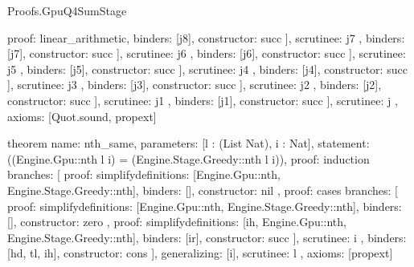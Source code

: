 \begin{lexlean}{Proofs.GpuQ4SumStage}
\begin{semanticmodule}
{{{{{{{{{{{{{{{{                                                {
                                                  proof: linear_arithmetic{},
                                                  binders: [j8],
                                                  constructor: succ
                                                }
                                              ],
                                              scrutinee: j7
                                            },
                                            binders: [j7],
                                            constructor: succ
                                          }
                                        ],
                                        scrutinee: j6
                                      },
                                      binders: [j6],
                                      constructor: succ
                                    }
                                  ],
                                  scrutinee: j5
                                },
                                binders: [j5],
                                constructor: succ
                              }
                            ],
                            scrutinee: j4
                          },
                          binders: [j4],
                          constructor: succ
                        }
                      ],
                      scrutinee: j3
                    },
                    binders: [j3],
                    constructor: succ
                  }
                ],
                scrutinee: j2
              },
              binders: [j2],
              constructor: succ
            }
          ],
          scrutinee: j1
        },
        binders: [j1],
        constructor: succ
      }
    ],
    scrutinee: j
  },
  axioms: [Quot.sound, propext]
}

theorem{
  name: nth_same,
  parameters: [l : (List Nat), i : Nat],
  statement: ((Engine.Gpu::nth l i) = (Engine.Stage.Greedy::nth l i)),
  proof: induction{
    branches: [
      {
        proof: simplify{definitions: [Engine.Gpu::nth, Engine.Stage.Greedy::nth]},
        binders: [],
        constructor: nil
      },
      {
        proof: cases{
          branches: [
            {
              proof: simplify{definitions: [Engine.Gpu::nth, Engine.Stage.Greedy::nth]},
              binders: [],
              constructor: zero
            },
            {
              proof: simplify{definitions: [ih, Engine.Gpu::nth, Engine.Stage.Greedy::nth]},
              binders: [ir],
              constructor: succ
            }
          ],
          scrutinee: i
        },
        binders: [hd, tl, ih],
        constructor: cons
      }
    ],
    generalizing: [i],
    scrutinee: l
  },
  axioms: [propext]
}


\end{semanticmodule}
\end{lexlean}
